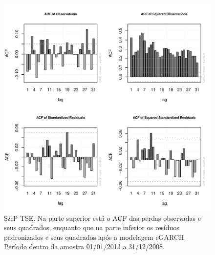\documentclass[review]{elsarticle}
\theoremstyle{definition}
\begin{document}
\begin{figure}[H]
	\centering
	\includegraphics[width=1\linewidth]{figs/artigo-acf-SP-TSE}
	\caption{S\&P TSE. Na parte superior está o ACF das perdas observadas e seus quadrados, enquanto que na parte inferior os resíduos padronizados e seus quadrados após a modelagem eGARCH. Período dentro da amostra 01/01/2013 a 31/12/2008.}
	\label{fig:artigo-acf-sptse}
\end{figure}
\end{document}
